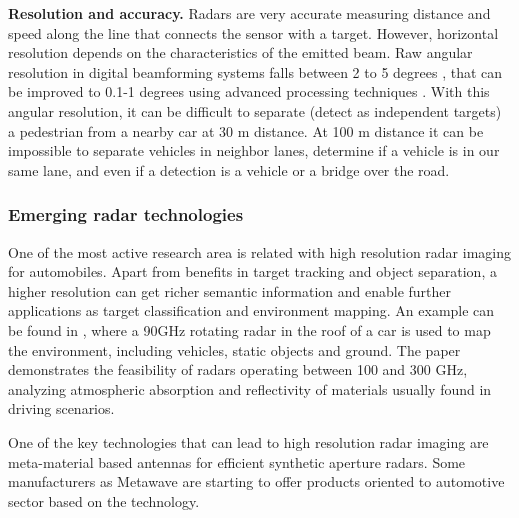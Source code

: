     \textbf{Resolution and accuracy.} Radars are very accurate measuring 
    distance
    and speed along the line that connects the sensor with a target. However, 
    horizontal resolution depends on the characteristics of the emitted beam.
    Raw angular resolution in digital beamforming systems falls between 2 to 5
    degrees \cite{Schneider2005}, that can be improved to 0.1-1 degrees using 
    advanced 
    processing techniques \cite{Kissinger2012}. 
    With this angular resolution, it can be difficult to separate (detect as
    independent targets) a pedestrian from a nearby car at 30 m distance. 
    At 100 m distance it can be impossible to separate vehicles in neighbor
    lanes, determine if a vehicle is in our same lane, and even if a detection
    is a vehicle or a bridge over the road.

\subsubsection{Emerging radar technologies}

One of the most active research area is related with high resolution radar
imaging for automobiles. Apart from benefits in target tracking and object
separation, a higher resolution can get richer semantic information and enable
further applications as target classification and environment mapping. 
An example can be found in \cite{Reina2015}, where a 90GHz rotating radar in
the roof of a car is used to map the environment, including vehicles, static
objects and ground.
The paper \cite{Kohler2013} demonstrates the feasibility of radars operating
between 100 and 300 GHz, analyzing atmospheric absorption and reflectivity of
materials usually found in driving scenarios.

One of the key technologies that can lead to high resolution radar imaging are 
meta-material based antennas \cite{Brookner2016,Sleasman2017} for efficient
synthetic aperture radars. 
Some manufacturers as Metawave 
are starting to offer products oriented to automotive sector based on the 
technology.

